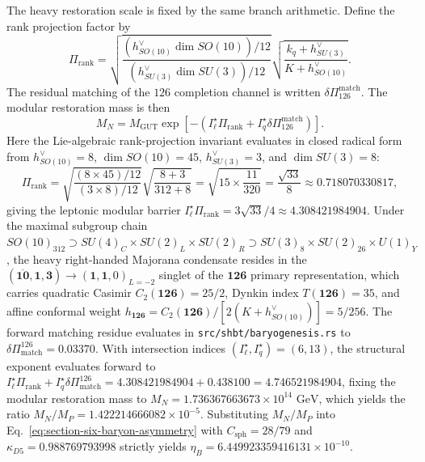 \documentclass[11pt,letterpaper]{article}
\theoremstyle{plain}
\DeclareMathOperator{\dimop}{dim}
\DeclareRobustCommand{\pyvar}[1]{%
  \ifmmode\text{\nolinkurl{#1}}\else\nolinkurl{#1}\fi%
}
\newcommand{\kq}{k_q}
\newcommand{\Kpar}{K}
\begin{document}
The heavy restoration scale is fixed by the same branch arithmetic.  Define the
rank projection factor by
\begin{equation}
\label{eq:section-six-rank-projection-factor}
 \Pi_{\text{rank}}
 =
 \sqrt{
 \frac{(h^{\vee}_{SO(10)}\dimop SO(10))/12}
 {(h^{\vee}_{SU(3)}\dimop SU(3))/12}}
 \sqrt{\frac{\kq+h^{\vee}_{SU(3)}}{\Kpar+h^{\vee}_{SO(10)}}}.
\end{equation}
The residual matching of the $126$ completion channel is written
$\delta\Pi_{126}^{\text{match}}$.  The modular restoration mass is then
\begin{equation}
\label{eq:section-six-modular-restoration-scale}
 \boxed{
 M_N
 =
 M_{\text{GUT}}
 \exp\!\left[-\left(
 I_{\ell}^{\star}\Pi_{\text{rank}}
 +
 I_q^{\star}\delta\Pi_{126}^{\text{match}}
 \right)\right].
 }
\end{equation}
Here the Lie-algebraic rank-projection invariant evaluates in closed radical form from $h^\vee_{SO(10)} = 8$, $\dim SO(10) = 45$, $h^\vee_{SU(3)} = 3$, and $\dim SU(3) = 8$:
\begin{equation}
\Pi_{\text{rank}} = \sqrt{\frac{(8 \times 45)/12}{(3 \times 8)/12}}\sqrt{\frac{8 + 3}{312 + 8}} = \sqrt{15 \times \frac{11}{320}} = \frac{\sqrt{33}}{8} \approx 0.718070330817,
\label{eq:pi_rank_evaluation}
\end{equation}
giving the leptonic modular barrier $I_\ell^\star \Pi_{\text{rank}} = 3\sqrt{33}/4 \approx 4.308421984904$. Under the maximal subgroup chain $SO(10)_{312} \supset SU(4)_C \times SU(2)_L \times SU(2)_R \supset SU(3)_8 \times SU(2)_{26} \times U(1)_Y$, the heavy right-handed Majorana condensate resides in the $(\mathbf{\overline{10}}, \mathbf{1}, \mathbf{3}) \to (\mathbf{1}, \mathbf{1}, 0)_{L=-2}$ singlet of the $\mathbf{126}$ primary representation, which carries quadratic Casimir $C_2(\mathbf{126}) = 25/2$, Dynkin index $T(\mathbf{126}) = 35$, and affine conformal weight $h_{\mathbf{126}} = C_2(\mathbf{126}) / [2(K + h^\vee_{SO(10)})] = 5/256$.
The forward matching residue evaluates in \pyvar{src/shbt/baryogenesis.rs} to $\delta\Pi_{\text{match}}^{126} = 0.03370$. With intersection indices $(I_\ell^\star, I_q^\star) = (6, 13)$, the structural exponent evaluates forward to $I_\ell^\star \Pi_{\text{rank}} + I_q^\star \delta\Pi_{\text{match}}^{126} = 4.308421984904 + 0.438100 = 4.746521984904$, fixing the modular restoration mass to $M_N = 1.736367663673 \times 10^{14}\text{ GeV}$, which yields the ratio $M_N / M_P = 1.422214666082 \times 10^{-5}$. Substituting $M_N / M_P$ into Eq.~\eqref{eq:section-six-baryon-asymmetry} with $C_{\text{sph}} = 28/79$ and $\kappa_{D5} = 0.988769793998$ strictly yields $\eta_B = 6.449923359416131 \times 10^{-10}$.
\end{document}
